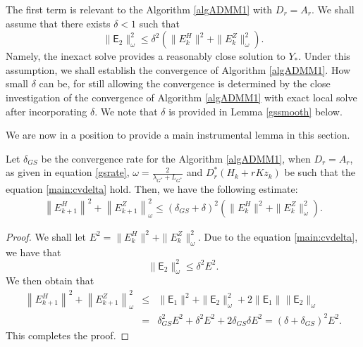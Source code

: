 The first term is relevant to the Algorithm \ref{algADMM1} with $D_r = A_r$. We shall assume that there exists $\delta < 1$ such that 
\begin{equation}\label{main:cvdelta}
\|\textsf{E}_2\|_\omega^2 \leq \delta^2 \left ( \|E_k^H\|^2 + \|E_k^Z\|_\omega^2 \right ).
\end{equation}
Namely, the inexact solve provides a reasonably close solution to $Y_*$. Under this assumption, we shall establish the convergence of Algorithm \ref{algADMM1}. How small $\delta$ can be, for still allowing the convergence is determined by the close investigation of the convergence of Algorithm \ref{algADMM1} with exact local solve after incorporating $\delta$. We note that $\delta$ is provided in Lemma \ref{gssmooth} below.    

We are now in a position to provide a main instrumental lemma in this section. 
\begin{theorem}\label{main:ins}
Let $\delta_{GS}$ be the convergence rate for the Algorithm \ref{algADMM1}, when $D_r = A_r$, as given in equation \eqref{gsrate}, $\omega = \frac{2}{\lambda_{G^*} + L_{G^*}}$ and $D_r^*(H_k + rKz_k)$ be such that the equation \eqref{main:cvdelta} hold. Then, we have the following estimate:   
\begin{eqnarray*}
\left \|E_{k+1}^H \right \|^2 + \left \|E_{k+1}^Z \right \|_\omega^2 \leq \left ( \delta_{GS} + \delta \right )^2 \left ( \|E_k^H\|^2 + \|E_k^Z\|_\omega^2 \right ). 
\end{eqnarray*}
\end{theorem} 
\begin{proof}
We shall let $E^2 = \|E_k^H\|^2 + \|E_k^Z\|_\omega^2$. Due to the equation \eqref{main:cvdelta}, we have that 
\begin{equation}
\|\textsf{E}_2\|_\omega^2 \leq \delta^2 E^2. 
\end{equation}
We then obtain that 
\begin{eqnarray*}
\left \|E_{k+1}^H \right \|^2 + \left \|E_{k+1}^Z \right \|_\omega^2 &\leq& \|\textsf{E}_1\|^2 + \|\textsf{E}_2\|_\omega^2 + 2 \|\textsf{E}_1\| \|\textsf{E}_2\|_\omega  \\ 
&=& \delta_{GS}^2 E^2 + \delta^2 E^2 + 2 \delta_{GS} \delta E^2 = (\delta + \delta_{GS})^2 E^2. 
\end{eqnarray*}
This completes the proof. 
\end{proof}

